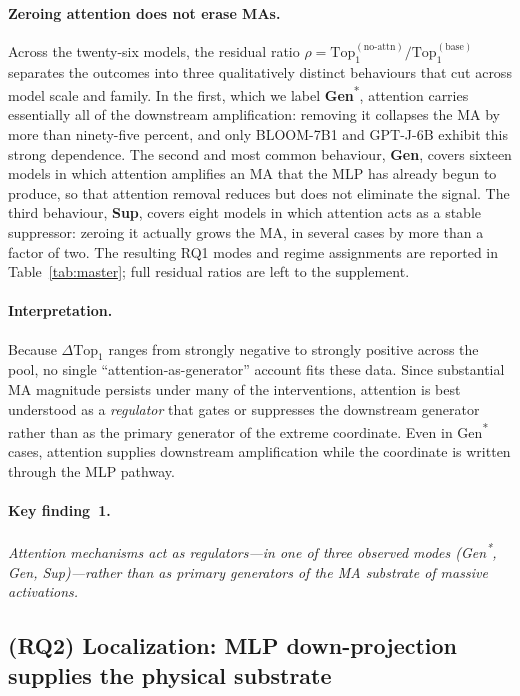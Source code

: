 \documentclass{article}
\newcommand{\topk}{\mathrm{Top}}
\begin{document}
\paragraph{Zeroing attention does not erase MAs.}
Across the twenty-six models, the residual ratio
$\rho = \topk_1^{(\text{no-attn})}/\topk_1^{(\text{base})}$ separates the
outcomes into three qualitatively distinct behaviours that cut across
model scale and family. In the first, which we label
\textbf{Gen}\textsuperscript{*}, attention carries essentially all of
the downstream amplification: removing it collapses the MA by more than
ninety-five percent, and only BLOOM-7B1 and GPT-J-6B exhibit this
strong dependence. The second and most common behaviour, \textbf{Gen},
covers sixteen models in which attention amplifies an MA that the MLP
has already begun to produce, so that attention removal reduces but
does not eliminate the signal. The third behaviour, \textbf{Sup}, covers
eight models in which attention acts as a stable suppressor: zeroing it
actually grows the MA, in several cases by more than a factor of two.
The resulting RQ1 modes and regime assignments are reported in
Table~\ref{tab:master}; full residual ratios are left to the supplement.

\paragraph{Interpretation.}
Because $\Delta\topk_1$ ranges from strongly negative to strongly
positive across the pool, no single ``attention-as-generator'' account
fits these data. Since substantial MA magnitude persists under many of
the interventions, attention is best understood as a \emph{regulator}
that gates or suppresses the downstream generator rather than as the
primary generator of the extreme coordinate. Even in Gen\textsuperscript{*}
cases, attention supplies downstream amplification while the coordinate is
written through the MLP pathway.

\paragraph{Key finding~1.}
\emph{Attention mechanisms act as regulators---in one of three observed
modes (Gen\textsuperscript{*}, Gen, Sup)---rather than as primary
generators of the MA substrate
of massive activations.}

\subsection{(RQ2) Localization: MLP down-projection supplies the physical substrate}
\label{sec:rq2}
\end{document}
